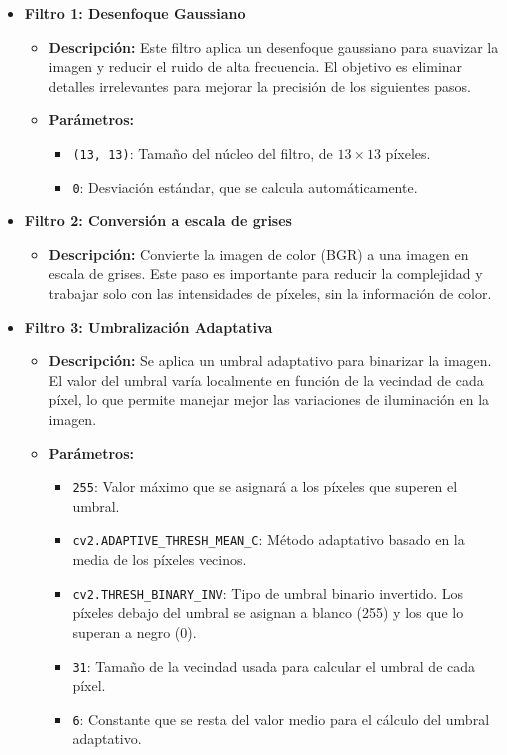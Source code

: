 \documentclass[12pt,a4paper]{article}
\begin{document}
\begin{itemize}
    \item \textbf{Filtro 1: Desenfoque Gaussiano}
    \begin{itemize}
        \item \textbf{Descripción:} Este filtro aplica un desenfoque gaussiano para suavizar la imagen y reducir el ruido de alta frecuencia. El objetivo es eliminar detalles irrelevantes para mejorar la precisión de los siguientes pasos.
        \item \textbf{Parámetros:}
        \begin{itemize}
            \item \texttt{(13, 13)}: Tamaño del núcleo del filtro, de \(13 \times 13\) píxeles.
            \item \texttt{0}: Desviación estándar, que se calcula automáticamente.
        \end{itemize}
    \end{itemize}

    \item \textbf{Filtro 2: Conversión a escala de grises}
    \begin{itemize}
        \item \textbf{Descripción:} Convierte la imagen de color (BGR) a una imagen en escala de grises. Este paso es importante para reducir la complejidad y trabajar solo con las intensidades de píxeles, sin la información de color.
    \end{itemize}

    \item \textbf{Filtro 3: Umbralización Adaptativa}
    \begin{itemize}
        \item \textbf{Descripción:} Se aplica un umbral adaptativo para binarizar la imagen. El valor del umbral varía localmente en función de la vecindad de cada píxel, lo que permite manejar mejor las variaciones de iluminación en la imagen.
        \item \textbf{Parámetros:}
        \begin{itemize}
            \item \texttt{255}: Valor máximo que se asignará a los píxeles que superen el umbral.
            \item \texttt{cv2.ADAPTIVE\_THRESH\_MEAN\_C}: Método adaptativo basado en la media de los píxeles vecinos.
            \item \texttt{cv2.THRESH\_BINARY\_INV}: Tipo de umbral binario invertido. Los píxeles debajo del umbral se asignan a blanco (255) y los que lo superan a negro (0).
            \item \texttt{31}: Tamaño de la vecindad usada para calcular el umbral de cada píxel.
            \item \texttt{6}: Constante que se resta del valor medio para el cálculo del umbral adaptativo.
        \end{itemize}
    \end{itemize}


\end{itemize}
\end{document}
